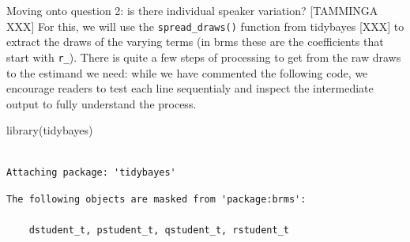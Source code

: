 \documentclass[
  authoryear,
  preprint,
  3p]{elsarticle}
\newenvironment{Shaded}{\begin{snugshade}}{\end{snugshade}}
\newcommand{\FunctionTok}[1]{\textcolor[rgb]{0.28,0.35,0.67}{#1}}
\newcommand{\NormalTok}[1]{\textcolor[rgb]{0.00,0.23,0.31}{#1}}
\begin{document}
Moving onto question 2: is there individual speaker variation?
{[}TAMMINGA XXX{]} For this, we will use the \texttt{spread\_draws()}
function from tidybayes {[}XXX{]} to extract the draws of the varying
terms (in brms these are the coefficients that start with \texttt{r\_}).
There is quite a few steps of processing to get from the raw draws to
the estimand we need: while we have commented the following code, we
encourage readers to test each line sequentialy and inspect the
intermediate output to fully understand the process.

\begin{Shaded}
\begin{Highlighting}[]
\FunctionTok{library}\NormalTok{(tidybayes)}
\end{Highlighting}
\end{Shaded}

\begin{verbatim}

Attaching package: 'tidybayes'
\end{verbatim}

\begin{verbatim}
The following objects are masked from 'package:brms':

    dstudent_t, pstudent_t, qstudent_t, rstudent_t
\end{verbatim}
\end{document}
